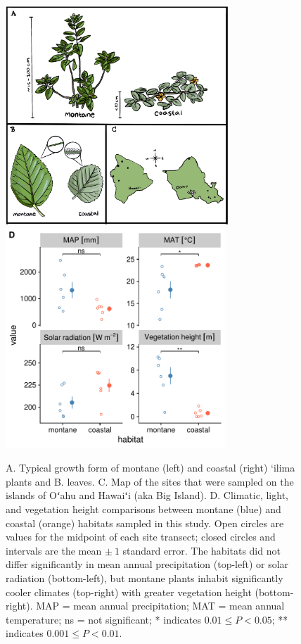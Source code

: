 \documentclass[
  letterpaper,
  DIV=11,
  numbers=noendperiod]{scrartcl}
\begin{document}
\begin{figure}[H]
  \includegraphics[height=3.25in]{../figures/study-system.pdf}
  \includegraphics[height=3.25in]{../figures/habitat-climate.pdf}
  \caption{A. Typical growth form of montane (left) and coastal (right) ‘ilima plants and B. leaves. C. Map of the sites that were sampled on the islands of Oʻahu and Hawaiʻi (aka Big Island). D. Climatic, light, and vegetation height comparisons between montane (blue) and coastal (orange) habitats sampled in this study. Open circles are values for the midpoint of each site transect; closed circles and intervals are the mean $\pm~1$ standard error. The habitats did not differ significantly in mean annual precipitation (top-left) or solar radiation (bottom-left), but montane plants inhabit significantly cooler climates (top-right) with greater vegetation height (bottom-right). MAP = mean annual precipitation; MAT = mean annual temperature; ns = not significant; * indicates $0.01 \le P < 0.05$; ** indicates $0.001 \le P < 0.01$.}
  \label{fig:study-system}
\end{figure}
\end{document}
